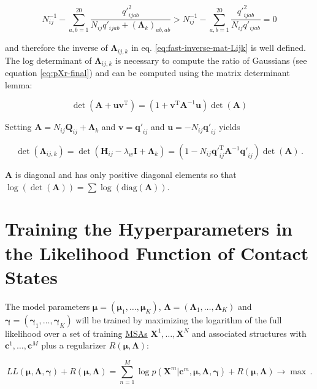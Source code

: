\documentclass[11pt,a4paper,twoside]{book}
\renewcommand{\H}{\mathbf{H}}
\newcommand{\I}{\mathbf{I}}
\newcommand{\Lijk}{\mathbf{\Lambda}_{ij,k}}
\newcommand{\Lk}{\mathbf{\Lambda}_k}
\renewcommand{\c}{\mathbf{c}}
\newcommand{\Qij}{\mathbf{Q}_{ij}}
\newcommand{\qij}{\mathbf{q\prime}_{ij}}
\renewcommand{\v}{\mathbf{v}}
\newcommand{\X}{\mathbf{X}}
\theoremstyle{definition}
\theoremstyle{definition}
\theoremstyle{remark}
\begin{document}
\begin{equation}
    N_{ij}^{-1} - \sum_{a,b=1}^{20}  \frac{{q'}_{ijab}^2}{N_{ij} q'_{ijab} + {(\Lk)}_{ab,ab} } > N_{ij}^{-1} - \sum_{a,b=1}^{20} \frac{{q'}^2_{ijab}}{N_{ij} q'_{ijab}} = 0
\end{equation}

and therefore the inverse of \(\Lijk\) in eq.
\eqref{eq:fast-inverse-mat-Lijk} is well defined. The log determinant of
\(\Lijk\) is necessary to compute the ratio of Gaussians (see equation
\eqref{eq:pXr-final}) and can be computed using the matrix determinant
lemma:

\begin{equation}
  \det(\mathbf{A} + \mathbf{uv}^\mathrm{T}) = (1+\mathbf{v}^\mathrm{T} \mathbf{A}^{-1} \mathbf{u}) \det(\mathbf{A})
\end{equation}

Setting \(\mathbf{A} = N_{ij} \Qij + \Lk\) and \(\v = \qij\) and
\(\mathbf{u} = - N_{ij} \qij\) yields

\begin{equation}
  \det(\Lijk ) = \det(\H_{ij} - \lambda_w \I + \Lk) = (1 - N_{ij}\qij^\mathrm{T} \mathbf{A}^{-1}\qij) \det(\mathbf{A}) \,.
\end{equation}

\(\mathbf{A}\) is diagonal and has only positive diagonal elements so
that
\(\log(\det(\mathbf{A})) = \sum \log \left( \text{diag}(\mathbf{A}) \right)\).

\section{Training the Hyperparameters in the Likelihood Function of
Contact States}\label{training-hyperparameters}

The model parameters
\(\mathbf{\mu} = (\mathbf{\mu}_{1},\ldots,\mathbf{\mu}_K)\),
\(\mathbf{\Lambda} = (\mathbf{\Lambda}_1,\ldots,\mathbf{\Lambda}_K)\)
and \(\mathbf{\gamma} = (\mathbf{\gamma}_1,\ldots,\mathbf{\gamma}_K)\)
will be trained by maximizing the logarithm of the full likelihood over
a set of training \protect\hyperlink{abbrev}{MSAs} \(\X^1,\ldots,\X^N\)
and associated structures with \(\c^1,\ldots,\c^M\) plus a regularizer
\(R(\mathbf{\mu}, \mathbf{\Lambda})\):

\begin{equation}
    L\!L(\mathbf{\mu}, \mathbf{\Lambda}, \mathbf{\gamma}) + R(\mathbf{\mu}, \mathbf{\Lambda}) = \sum_{n=1}^M  \log p(\X^m | \c^m, \mathbf{\mu}, \mathbf{\Lambda}, \mathbf{\gamma} ) + R(\mathbf{\mu}, \mathbf{\Lambda})  \rightarrow \max \, .
\end{equation}
\end{document}
